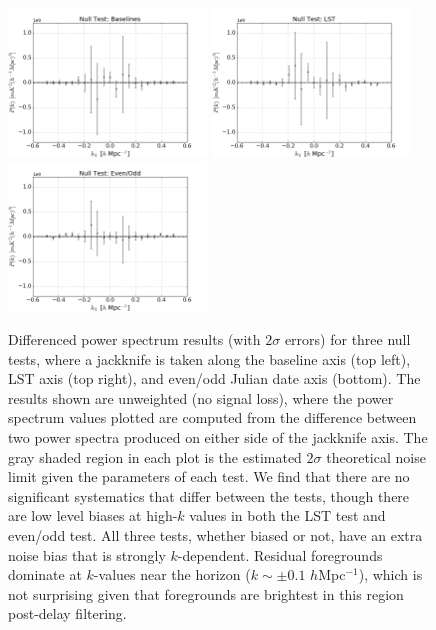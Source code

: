 \documentclass[preprint2,numberedappendix,tighten]{aastex6}  %
\begin{document}
\begin{figure}
	\centering
	\includegraphics[width=0.47\textwidth]{plots/null_bls.png}
	\includegraphics[width=0.47\textwidth]{plots/null_lsts.png}
	\includegraphics[width=0.47\textwidth]{plots/null_eo.png}
	\caption{Differenced power spectrum results (with $2\sigma$ errors) for three null tests, where a jackknife is taken along the baseline axis (top left), LST axis (top right), and even/odd Julian date axis (bottom). The results shown are unweighted (no signal loss), where the power spectrum values plotted are computed from the difference between two power spectra produced on either side of the jackknife axis. The gray shaded region in each plot is the estimated $2\sigma$ theoretical noise limit given the parameters of each test. We find that there are no significant systematics that differ between the tests, though there are low level biases at high-$k$ values in both the LST test and even/odd test. All three tests, whether biased or not, have an extra noise bias that is strongly $k$-dependent. Residual foregrounds dominate at $k$-values near the horizon ($k\sim\pm 0.1$ $h$Mpc$^{-1}$), which is not surprising given that foregrounds are brightest in this region post-delay filtering.}
	\label{fig:null}
\end{figure}
\end{document}
